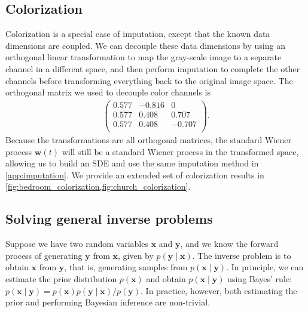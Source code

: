 \documentclass{article} %
\newcommand{\bfx}{\mathbf{x}}
\newcommand{\bfw}{\mathbf{w}}
\newcommand{\bfy}{\mathbf{y}}
\begin{document}
\subsection{Colorization}\label{app:colorization}
Colorization is a special case of imputation, except that the known data dimensions are coupled. We can decouple these data dimensions by using an orthogonal linear transformation to map the gray-scale image to a separate channel in a different space, and then perform imputation to complete the other channels before transforming everything back to the original image space. The orthogonal matrix we used to decouple color channels is
\begin{align*}
    \begin{pmatrix}
        0.577 &  -0.816 &  0\\
        0.577 &  0.408 &  0.707\\
        0.577 &  0.408 & -0.707\\
    \end{pmatrix}.
\end{align*}
Because the transformations are all orthogonal matrices, the standard Wiener process $\bfw(t)$ will still be a standard Wiener process in the transformed space, allowing us to build an SDE and use the same imputation method in \cref{app:imputation}. We provide an extended set of colorization results in \cref{fig:bedroom_colorization,fig:church_colorization}.

\subsection{Solving general inverse problems}\label{app:inverse_prob}
Suppose we have two random variables $\bfx$ and $\bfy$, and we know the forward process of generating $\bfy$ from $\bfx$, given by $p(\bfy \mid \bfx)$. The inverse problem is to obtain $\bfx$ from $\bfy$, that is, generating samples from $p(\bfx \mid \bfy)$. In principle, we can estimate the prior distribution $p(\bfx)$ and obtain $p(\bfx \mid \bfy)$ using Bayes' rule: $p(\bfx \mid \bfy) = p(\bfx) p(\bfy \mid \bfx) / p(\bfy)$. In practice, however, both estimating the prior and performing Bayesian inference are non-trivial.
\end{document}
